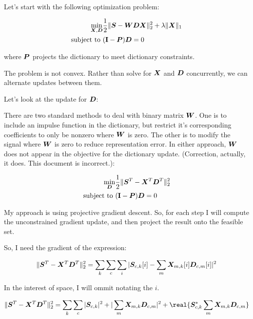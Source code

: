 \documentclass{article}
\begin{document}
Let's start with the following optimization problem:

\begin{equation}
\begin{aligned}
\min_{\bm{X},\bm{D}} & \frac{1}{2}\|\bm{S} - \bm{W}\bm{D}\bm{X}\|_2^2 + \lambda\|\bm{X}\|_1 \\
\text{subject to } & ({\bf I} - \bm{P})\bm{D} = 0
\end{aligned}
\end{equation}

where $\bm{P}$ projects the dictionary to meet dictionary constraints.

The problem is not convex. Rather than solve for $\bm{X}$ and $\bm{D}$ concurrently, we can alternate updates between them.

Let's look at the update for $\bm{D}$:

There are two standard methods to deal with binary matrix $\bm{W}$. One is to include an impulse function in the dictionary, but restrict it's corresponding coefficients to only be nonzero where $\bm{W}$ is zero.  The other is to modify the signal where $\bm{W}$ is zero to reduce representation error. In either approach, $\bm{W}$ does not appear in the objective for the dictionary update.  (Correction, actually, it does. This document is incorrect.):

\begin{equation}
\begin{aligned}
\min_{\bm{D}} & \frac{1}{2}\|\bm{S}^T - \bm{X}^T\bm{D}^T\|_2^2 \\
\text{subject to } & ({\bf I} - \bm{P})\bm{D} = 0
\end{aligned}
\end{equation}

My approach is using projective gradient descent. So, for each step I will compute the unconstrained gradient update, and then project the result onto the feasible set.

So, I need the gradient of the expression:

\begin{equation}
\|\bm{S}^T - \bm{X}^T\bm{D}^T\|_2^2 = \sum_k \sum_c \sum_i |\bm{S}_{c,k}[i] - \sum_m \bm{X}_{m,k}[i]\bm{D}_{c,m}[i]|^2
\end{equation}

In the interest of space, I will ommit notating the $i$.

\begin{equation}
\|\mS^T - \mX^T\mD^T\|_2^2 =  \sum_k \sum_c  |\mS_{c,k}|^2 + |\sum_m \mX_{m,k}\mD_{c,m}|^2 + \real{\mS_{c,k}^{*}\sum_m \mX_{m,k}\mD_{c,m}} 
\end{equation}
\end{document}
